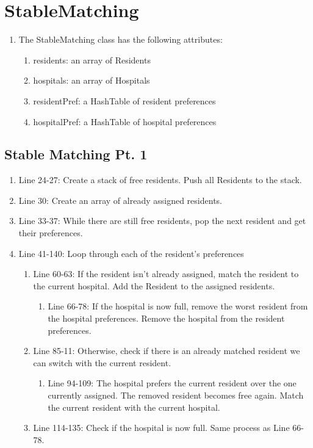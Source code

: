 \documentclass[letterpaper, 10pt,DIV=13]{scrartcl}
\numberwithin{equation}{section} %
\numberwithin{figure}{section} %
\numberwithin{table}{section} %
\begin{document}
\section{StableMatching}
\begin{enumerate}
    \item The StableMatching class has the following attributes: 
    \begin{enumerate}
        \item residents: an array of Residents
        \item hospitals: an array of Hospitals
        \item residentPref: a HashTable of resident preferences
        \item hospitalPref: a HashTable of hospital preferences
    \end{enumerate}
\end{enumerate}
\subsection{Stable Matching Pt. 1}
\begin{enumerate}
    \item Line 24-27: Create a stack of free residents. Push all Residents to the stack.
    \item Line 30: Create an array of already assigned residents.
    \item Line 33-37: While there are still free residents, pop the next resident and get their preferences.
    \item Line 41-140: Loop through each of the resident's preferences
    \begin{enumerate}
        \item Line 60-63: If the resident isn't already assigned, match the resident to the current hospital. Add the Resident to the assigned residents.
        \begin{enumerate}
            \item Line 66-78: If the hospital is now full, remove the worst resident from the hospital preferences. Remove the hospital from the resident preferences. 
        \end{enumerate}
        \item Line 85-11: Otherwise, check if there is an already matched resident we can switch with the current resident.
        \begin{enumerate}
            \item Line 94-109: The hospital prefers the current resident over the one currently assigned. The removed resident becomes free again. Match the current resident with the current hospital.
        \end{enumerate}
        \item Line 114-135: Check if the hospital is now full. Same process as Line 66-78.
    \end{enumerate}
\end{enumerate}
\end{document}
